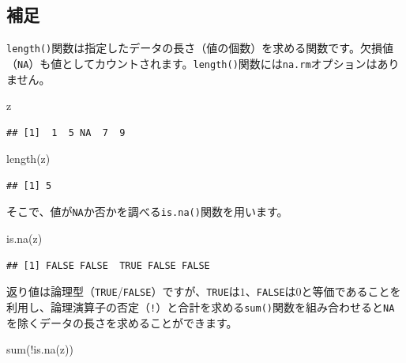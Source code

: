 \documentclass[
  12pt,
]{book}
\newenvironment{Shaded}{\begin{snugshade}}{\end{snugshade}}
\newcommand{\FunctionTok}[1]{\textcolor[rgb]{0.00,0.00,0.00}{#1}}
\newcommand{\NormalTok}[1]{#1}
\newcommand{\SpecialCharTok}[1]{\textcolor[rgb]{0.00,0.00,0.00}{#1}}
\begin{document}
\hypertarget{ux88dcux8db3}{%
\subsection*{補足}\label{ux88dcux8db3}}

\texttt{length()}関数は指定したデータの長さ（値の個数）を求める関数です。欠損値（\texttt{NA}）も値としてカウントされます。\texttt{length()}関数には\texttt{na.rm}オプションはありません。

\begin{Shaded}
\begin{Highlighting}[numbers=left,,]
\NormalTok{z}
\end{Highlighting}
\end{Shaded}

\begin{verbatim}
## [1]  1  5 NA  7  9
\end{verbatim}

\begin{Shaded}
\begin{Highlighting}[numbers=left,,]
\FunctionTok{length}\NormalTok{(z)}
\end{Highlighting}
\end{Shaded}

\begin{verbatim}
## [1] 5
\end{verbatim}

そこで、値が\texttt{NA}か否かを調べる\texttt{is.na()}関数を用います。

\begin{Shaded}
\begin{Highlighting}[numbers=left,,]
\FunctionTok{is.na}\NormalTok{(z)}
\end{Highlighting}
\end{Shaded}

\begin{verbatim}
## [1] FALSE FALSE  TRUE FALSE FALSE
\end{verbatim}

返り値は論理型（\texttt{TRUE}/\texttt{FALSE}）ですが、\texttt{TRUE}は\(1\)、\texttt{FALSE}は\(0\)と等価であることを利用し、論理演算子の否定（\texttt{!}）と合計を求める\texttt{sum()}関数を組み合わせると\texttt{NA}を除くデータの長さを求めることができます。

\begin{Shaded}
\begin{Highlighting}[numbers=left,,]
\FunctionTok{sum}\NormalTok{(}\SpecialCharTok{!}\FunctionTok{is.na}\NormalTok{(z))}
\end{Highlighting}
\end{Shaded}
\end{document}
